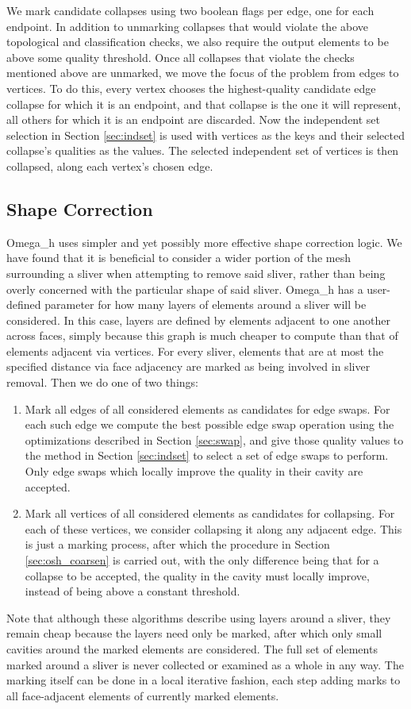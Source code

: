 We mark candidate collapses using two boolean flags per edge, one for each
endpoint.
In addition to unmarking collapses that would violate the above topological
and classification checks, we also require the output elements to be
above some quality threshold.
Once all collapses that violate the checks mentioned above are unmarked,
we move the focus of the problem from edges to vertices.
To do this, every vertex chooses the highest-quality candidate edge collapse
for which it is an endpoint, and that collapse is the one it will
represent, all others for which it is an endpoint are discarded.
Now the independent set selection in Section \ref{sec:indset} is used
with vertices as the keys and their selected collapse's qualities as the
values.
The selected independent set of vertices is then collapsed, along each
vertex's chosen edge.

\subsection{Shape Correction}
\label{sec:osh_shape}

Omega\_h uses simpler and yet possibly more effective shape correction logic.
We have found that it is beneficial to consider a wider portion of the
mesh surrounding a sliver when attempting to remove said sliver, rather
than being overly concerned with the particular shape of said sliver.
Omega\_h has a user-defined parameter for how many layers of elements
around a sliver will be considered.
In this case, layers are defined by elements adjacent to one another
across faces, simply because this graph is much cheaper to compute
than that of elements adjacent via vertices.
For every sliver, elements that are at most the specified distance
via face adjacency are marked as being involved in sliver removal.
Then we do one of two things:
\begin{enumerate}
\item Mark all edges of all considered elements as candidates for edge swaps.
For each such edge we compute the best possible edge swap operation
using the optimizations described in Section \ref{sec:swap},
and give those quality values to the method in Section \ref{sec:indset} to
select a set of edge swaps to perform.
Only edge swaps which locally improve the quality in their cavity are accepted.
\item Mark all vertices of all considered elements as candidates for collapsing.
For each of these vertices, we consider collapsing it along any adjacent edge.
This is just a marking process, after which the procedure in Section \ref{sec:osh_coarsen}
is carried out, with the only difference being that for a collapse to be accepted,
the quality in the cavity must locally improve, instead of being above a
constant threshold.
\end{enumerate}
Note that although these algorithms describe using layers around a sliver,
they remain cheap because the layers need only be marked, after which only
small cavities around the marked elements are considered.
The full set of elements marked around a sliver is never collected or examined
as a whole in any way.
The marking itself can be done in a local iterative fashion, each step adding
marks to all face-adjacent elements of currently marked elements.

